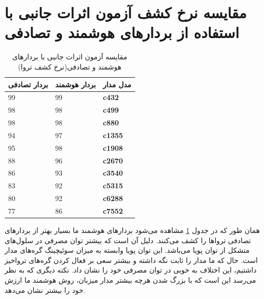 \section{مقایسه نرخ کشف آزمون اثرات جانبی با استفاده از بردارهای هوشمند و تصادفی}
\begin{table}[t]
	\label{tsideivectors}
	\begin{center}
		\begin{tabular}{| p{4cm} | p{4cm} |p{2cm}|}
			\hline
			\textbf{ بردار تصادفی} & \textbf{ بردار هوشمند} & \textbf{مدل مدار} \\ \hline \hline
			99 & 99 &\textbf{c432} \\ \hline
			98 & 98 &\textbf{c499} \\ \hline
			98 & 98 &\textbf{c880} \\ \hline
			94 & 97 &\textbf{c1355} \\ \hline
			95 & 98 &\textbf{c1908} \\ \hline
			88 & 96 &\textbf{c2670} \\ \hline
			86 & 93 &\textbf{c3540} \\ \hline
			83 & 92 &\textbf{c5315} \\ \hline
			80 & 92 &\textbf{c6288} \\ \hline
			77 & 86 &\textbf{c7552} \\ \hline 
		\end{tabular}
		\caption{
		مقایسه آزمون اثرات جانبی با بردارهای هوشمند و تصادفی(نرخ کشف تروا)}
	\end{center}
\end{table}
همان طور که در جدول \ref{tsideivectors} مشاهده می‌شود بردارهای هوشمند ما بسیار بهتر از بردارهای تصادفی تروا‌ها را کشف می‌کنند. دلیل آن است که بیشتر توان مصرفی در سلول‌های
متشکل از توان پویا می‌باشد. این توان پویا وابسته به میزان سوئیچینگ گره‌های مدار است. حال که ما مدار را ثابت نگه داشته و بیشتر سعی بر فعال کردن گره‌های تروا‌خیز داشتیم، این اختلاف به خوبی در توان مصرفی خود را نشان داد. نکته دیگری که به نظر می‌رسد این است که با بزرگ شدن هرچه بیشتر مدار میزبان، روش هوشمند ما ارزش خود را بیشتر نشان می‌دهد.





